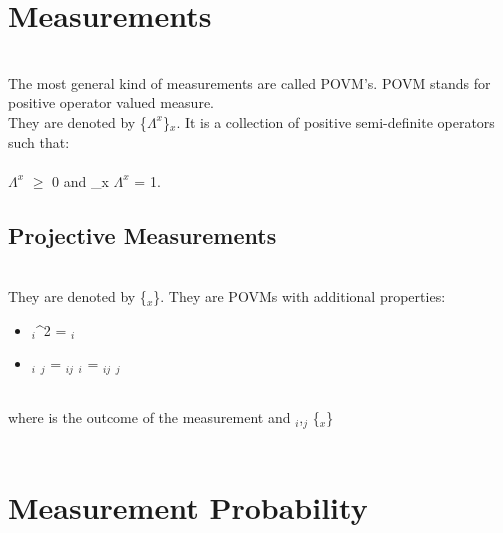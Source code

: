 \documentclass{article}
\begin{document}
\section{Measurements} \\
The most general kind of measurements are called POVM’s. POVM stands for positive operator valued measure. \\
They are denoted by \{$\Lambda^{x}$\}$_{x}$. It is a collection of positive semi-definite operators such that: \\ \\
{$\Lambda^{x}$} $\ge$ 0 and \sum\limits_{x} {$\Lambda^{x}$} = 1. \\

\subsection{Projective Measurements} \\
They are denoted by \{$_{x}$\}. They are POVMs with additional properties:
\begin{itemize}
	\item {}$_{i}$^{2} = $_{i}$
\end{itemize}
\begin{itemize}
	\item {}$_{i}$ $_{j}$  = \delta$_{ij}$ $_{i}$ = \delta$_{ij}$ $_{j}$
\end{itemize}
\\

where  is the outcome of the measurement and $_{i}$,$_{j}$ \in \{$_{x}$\} \\ \\

\section{Measurement Probability}
\end{document}
